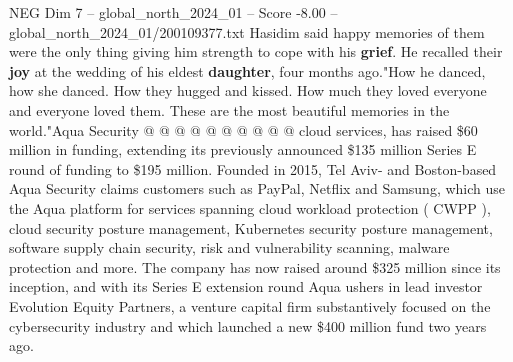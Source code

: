 \begin{textsample}{NEG Dim 7 – global\_north\_2024\_01 – Score -8.00 – global\_north\_2024\_01/200109377.txt}
Hasidim said happy memories of them were the only thing giving him strength to cope with his \textbf{grief}.
He recalled their \textbf{joy} at the wedding of his eldest \textbf{daughter}, four months ago."How he danced, how she danced.
How they hugged and kissed.
How much they loved everyone and everyone loved them.
These are the most beautiful memories in the world."Aqua Security @ @ @ @ @ @ @ @ @ @ cloud services, has raised \$60 million in funding, extending its previously announced \$135 million Series E round of funding to \$195 million.
Founded in 2015, Tel Aviv- and Boston-based Aqua Security claims customers such as PayPal, Netflix and Samsung, which use the Aqua platform for services spanning cloud workload protection ( CWPP ), cloud security posture management, Kubernetes security posture management, software supply chain security, risk and vulnerability scanning, malware protection and more.
The company has now raised around \$325 million since its inception, and with its Series E extension round Aqua ushers in lead investor Evolution Equity Partners, a venture capital firm substantively focused on the cybersecurity industry and which launched a new \$400 million fund two years ago.

\end{textsample}
